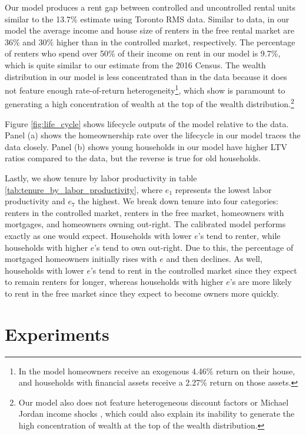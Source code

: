 \documentclass[parskip=full]{article}
\begin{document}
Our model produces a rent gap between controlled and uncontrolled rental units similar to the 13.7\% \citet{zhang-gou} estimate using Toronto RMS data. Similar to data, in our model the average income and house size of renters in the free rental market are 36\% and 30\% higher than in the controlled market, respectively. The percentage of renters who spend over 50\% of their income on rent in our model is 9.7\%, which is quite similar to our estimate from the 2016 Census. The wealth distribution in our model is less concentrated than in the data because it does not feature enough rate-of-return heterogeneity\footnote{In the model homeowners receive an exogenous 4.46\% return on their house, and households with financial assets receive a 2.27\% return on those assets.}, which \citet{fagereng} show is paramount to generating a high concentration of wealth at the top of the wealth distribution.\footnote{Our model also does not feature heterogeneous discount factors \citep{ks-1998} or Michael Jordan income shocks \citep{mj-shocks}, which could also explain its inability to generate the high concentration of wealth at the top of the wealth distribution.}

Figure \ref{fig:life_cycle} shows lifecycle outputs of the model relative to the data. Panel (a) shows the homeownership rate over the lifecycle in our model traces the data closely. Panel (b) shows young households in our model have higher LTV ratios compared to the data, but the reverse is true for old households. 

Lastly, we show tenure by labor productivity in table \ref{tab:tenure_by_labor_productivity}, where $e_{1}$ represents the lowest labor productivity and $e_{7}$ the highest. We break down tenure into four categories: renters in the controlled market, renters in the free market, homeowners with mortgages, and homeowners owning out-right. The calibrated model performs exactly as one would expect. Households with lower $e$'s tend to renter, while households with higher $e$'s tend to own out-right. Due to this, the percentage of mortgaged homeowners initially rises with $e$ and then declines. As well, households with lower $e$'s tend to rent in the controlled market since they expect to remain renters for longer, whereas households with higher $e$'s are more likely to rent in the free market since they expect to become owners more quickly. 

\section{Experiments}\label{section:experiments}
\end{document}
